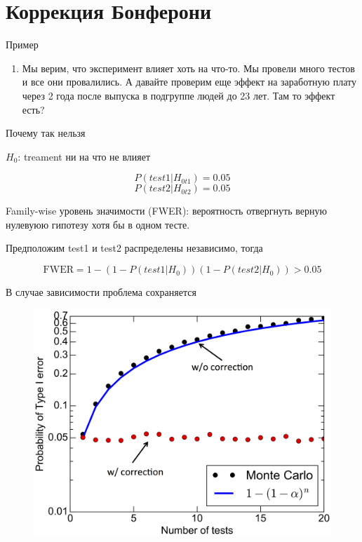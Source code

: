 
\section{Коррекция Бонферони}


\begin{frame}{Пример}
\begin{enumerate}
    \item Мы верим, что эксперимент влияет хоть на что-то. Мы провели много тестов и все они провалились. А давайте проверим еще эффект на заработную плату через 2 года после выпуска в подгруппе людей до 23 лет. Там то эффект есть?
\end{enumerate}

\end{frame}


\begin{frame}{Почему так нельзя}

$H_0$: treament ни на что не влияет

$$P(test1|H_{0t1}) = 0.05$$
$$P(test2|H_{0t2}) = 0.05$$

Family-wise уровень значимости (FWER): вероятность отвергнуть верную нулевуюю гипотезу хотя бы в одном тесте.

Предположим test1 и test2 распределены независимо, тогда

$$\text{FWER} = 1 - (1 - P(test1|H_0))(1 - P(test2|H_0)) > 0.05$$

В случае зависимости проблема сохраняется

\end{frame}

\begin{frame}
\begin{figure}
    \centering
    \includegraphics[width=\textwidth]{Lecture_Sources/Images/multiple_testing_loss_of_power.png}
\end{figure}
\end{frame}

